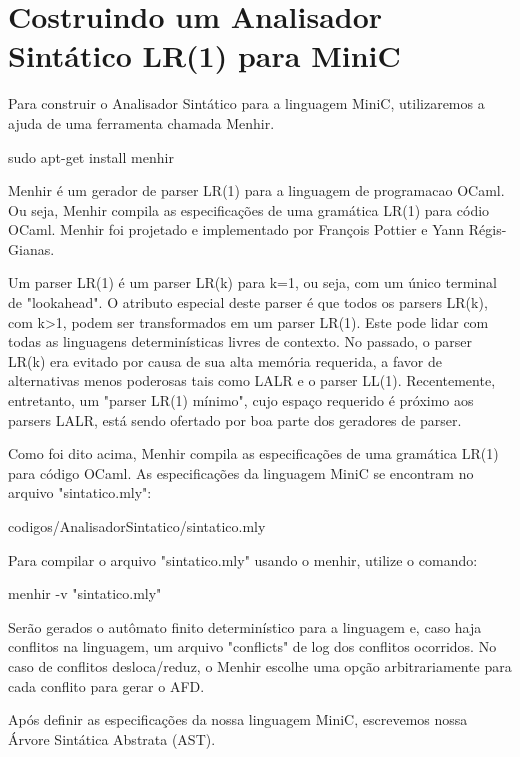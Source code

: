 \documentclass[12pt,a4paper,twoside]{report}
\begin{document}
\section{Costruindo um Analisador Sintático LR(1) para MiniC}

Para construir o Analisador Sintático para a linguagem MiniC, utilizaremos a ajuda de uma ferramenta chamada Menhir.

\begin{terminal}
sudo apt-get install menhir
\end{terminal}

Menhir é um gerador de parser LR(1) para a linguagem de programacao OCaml. Ou seja, Menhir compila as especificações de uma gramática LR(1) para códio OCaml. Menhir foi projetado e implementado por François Pottier e Yann Régis-Gianas.

Um parser LR(1) é um parser LR(k) para k=1, ou seja, com um único terminal de "lookahead". O atributo especial deste parser é que todos os parsers LR(k), com k>1, podem ser transformados em um parser LR(1). Este pode lidar com todas as linguagens determinísticas livres de contexto. No passado, o parser LR(k) era evitado por causa de sua alta memória requerida, a favor de alternativas menos poderosas tais como LALR e o parser LL(1). Recentemente, entretanto, um "parser LR(1) mínimo", cujo espaço requerido é próximo aos parsers LALR, está sendo ofertado por boa parte dos geradores de parser. 

Como foi dito acima, Menhir compila as especificações de uma gramática LR(1) para código OCaml. As especificações da linguagem MiniC se encontram no arquivo "sintatico.mly":

 {codigos/AnalisadorSintatico/sintatico.mly}

Para compilar o arquivo "sintatico.mly" usando o menhir, utilize o comando:

\begin{terminal}
menhir -v "sintatico.mly"
\end{terminal}

Serão gerados o autômato finito determinístico para a linguagem e, caso haja conflitos na linguagem, um arquivo "conflicts" de log dos conflitos ocorridos. No caso de conflitos desloca/reduz, o Menhir escolhe uma opção arbitrariamente para cada conflito para gerar o AFD.

Após definir as especificações da nossa linguagem MiniC, escrevemos nossa Árvore Sintática Abstrata (AST).
\end{document}
